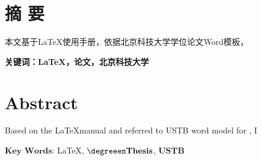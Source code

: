 
\chapter*{ 摘 \space 要 }
本文基于\LaTeX 使用手册，依据北京科技大学\degreecn 学位论文Word模板，


\vskip 30bp
{

    \textbf{ \heiti {} 关键词：\LaTeX ，\degreecn 论文，北京科技大学}
}



\chapter*{ Abstract }
Based on the \LaTeX manual and referred to USTB word model for \degreeen, I

\vskip 30bp
{
    $\mathbf{Key}$ $\mathbf{Words}$: {\LaTeX}, $\mathbf{\degreeen \space Thesis}$, $\mathbf{USTB}$
}
